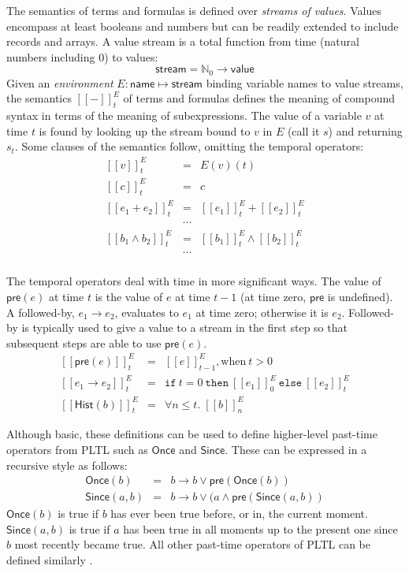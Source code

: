 \documentclass[global,twocolumn]{svjour}
\newcommand{\konst}[1]{\ensuremath{\mathsf{#1}}}
\newcommand{\sem}[1]{\ensuremath{[\![ #1 ]\!]}}
\newcommand{\itelse}[3]{\mbox{$\mathtt{if}\ {#1}\ \mathtt{then}\ {#2}\ \mathtt{else}\ {#3}$}}
\begin{document}
The semantics of terms and formulas is defined over \emph{streams of values}.
%
Values encompass at least booleans and numbers but can be readily extended to include records and arrays.
%
A value stream is a total function from time (natural numbers including 0) to values:
%
\[
 \konst{stream} = \mathbb{N}_0 \to \konst{value}
\]
%
Given an \emph{environment} $E : \konst{name} \mapsto \konst{stream}$ binding variable names to value streams, the semantics $\sem{-}^E_t$ of terms and formulas defines the meaning of compound syntax in terms of the meaning of subexpressions.
%
The value of a variable $v$ at time $t$ is found by looking up the stream bound to $v$ in $E$ (call it $s$) and returning $s_t$. Some clauses of the semantics follow, omitting the temporal operators:
%
\[
\begin{array}{rcl}
\sem{v}^E_t & = & E(v)(t) \\
\sem{c}^E_t & = & c \\
\sem{e_1 + e_2}^E_t & = & \sem{e_1}^E_t + \sem{e_2}^E_t \\
   & \cdots & \\
\sem{b_1 \land b_2}^E_t & = & \sem{b_1}^E_t \land \sem{b_2}^E_t \\
   & \cdots & \\
\end{array}
\]

The temporal operators deal with time in more significant ways.
%
The value of $\konst{pre}(e)$ at time $t$ is the value of $e$ at time $t-1$ (at time zero, \konst{pre} is undefined).
%
A followed-by, $e_1 \to e_2$, evaluates to $e_1$ at time zero; otherwise it is $e_2$.
%
Followed-by is typically used to give a value to a stream in the first step so that subsequent steps are able to use $\konst{pre}(e)$.
%
\[
\begin{array}{rcl}
\sem{\konst{pre}(e)}^E_t & = & \sem{e}^E_{t-1}, \mathrm{when}\ t > 0 \\
\sem{e_1 \to e_2}^E_t & = & \itelse{t=0}{\sem{e_1}^E_0}{\sem{e_2}^E_t} \\
\sem{\konst{Hist}(b)}^E_t & = & \forall n \leq t.\; \sem{b}^E_n
\end{array}
\]

Although basic, these definitions can be used to define higher-level past-time operators from PLTL such as \konst{Once} and \konst{Since}.
%
These can be expressed in a recursive style as follows:
%
\[
\begin{array}{rcl}
\konst{Once}(b) & = & b \to b \vee \konst{pre}(\konst{Once}(b)) \\
\konst{Since}(a, b) & = & b \to b \lor (a \land \konst{pre}(\konst{Since}(a, b))
\end{array}
\]
%
\noindent $\konst{Once}(b)$ is true if $b$ has ever been true before, or in, the current moment.
%
$\konst{Since}(a, b)$ is true if $a$ has been true in all moments up to the present one since $b$ most recently became true.
%
All other past-time operators of PLTL can be defined similarly \cite{monitor}.
\end{document}
